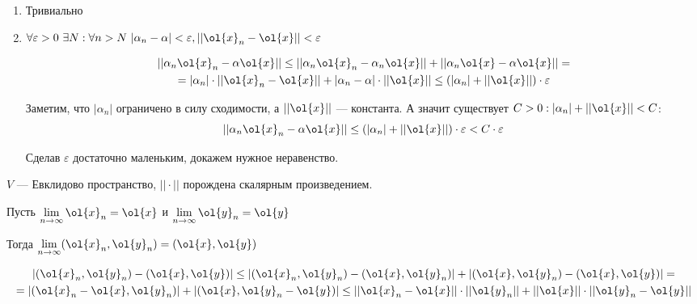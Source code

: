 \begin{enumerate}
    \item
        Тривиально
    \item
        \(
            \forall \varepsilon > 0 \ \exists N : \forall n > N \
            |\alpha_n - \alpha| < \varepsilon, || \ol{x}_n - \ol{x} || < \varepsilon
        \)

        \begin{gather*}
            || \alpha_n \ol{x}_n - \alpha \ol{x} ||
            \leq
            || \alpha_n \ol{x}_n - \alpha_n \ol{x} || + || \alpha_n \ol{x} - \alpha \ol{x} ||
            =
            \\
            =
            | \alpha_n | \cdot || \ol{x}_n - \ol{x} || + |\alpha_n - \alpha| \cdot || \ol{x} ||
            \leq
            (| \alpha_n | + || \ol{x} ||) \cdot \varepsilon
        \end{gather*}

        Заметим, что \( |\alpha_n| \) ограничено в силу сходимости, а \( || \ol{x} || \) --- константа.
        А значит существует \( C > 0 : | \alpha_n | + || \ol{x} || < C \):
        \[
            || \alpha_n \ol{x}_n - \alpha \ol{x} ||
            \leq
            (| \alpha_n | + || \ol{x} ||) \cdot \varepsilon
            <
            C \cdot \varepsilon
        \]

        Сделав \( \varepsilon \) достаточно маленьким, докажем нужное неравенство.
\end{enumerate}

\begin{thrm}{}{}
    \( V \) --- Евклидово пространство, \( || \cdot || \) порождена скалярным произведением.

    Пусть \( \lim\limits_{n \to \infty} \ol{x}_n = \ol{x} \) и \( \lim\limits_{n \to \infty} \ol{y}_n = \ol{y} \)

    Тогда \( \lim\limits_{n \to \infty} (\ol{x}_n, \ol{y}_n) = (\ol{x}, \ol{y}) \)
\end{thrm}

\begin{gather*}
    | (\ol{x}_n, \ol{y}_n) - (\ol{x}, \ol{y}) |
    \leq
    | (\ol{x}_n, \ol{y}_n) - (\ol{x}, \ol{y}_n)| + | (\ol{x}, \ol{y}_n) - (\ol{x}, \ol{y}) |
    =
    \\
    =
    | (\ol{x}_n - \ol{x}, \ol{y}_n) | + | (\ol{x}, \ol{y}_n - \ol{y}) |
    \leq
    || \ol{x}_n - \ol{x} || \cdot || \ol{y}_n || + || \ol{x} || \cdot || \ol{y}_n - \ol{y} ||
\end{gather*}


